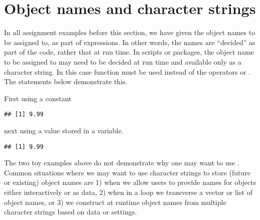 \documentclass[krantz2]{krantz}\usepackage{knitr}%
\begin{document}
\section{Object names and character strings}

In all assignment examples before this section, we have given the object names to be assigned to, as part of expressions. In other words, the names are ``decided'' as part of the code, rather that at run time. In scripts or packages, the object name to be assigned to may need to be decided at run time and available only as a character string. In this case function  must be used instead of the operators \code{<-} or \code{->}. The statements below demonstrate this.

First using a  constant

\begin{knitrout}\footnotesize
{}\color{fgcolor}\begin{kframe}
\begin{alltt}
\hlstd{(}\hlstd{,} \hlstd{)}
\end{alltt}
\begin{verbatim}
## [1] 9.99
\end{verbatim}
\end{kframe}
\end{knitrout}
next using a  value stored in a variable.

\begin{knitrout}\footnotesize
{}\color{fgcolor}\begin{kframe}
\begin{alltt}
 \hlkwb{<-} 
 \hlstd{)}
\end{alltt}
\begin{verbatim}
## [1] 9.99
\end{verbatim}
\end{kframe}
\end{knitrout}

The two toy examples above do not demonstrate why one may want to use . Common situations where we may want to use character strings to store (future or existing) object names are 1) when we allow users to provide names for objects either interactively or as  data, 2) when in a loop we transverse a vector or list of object names, or 3) we construct at runtime object names from multiple character strings based on data or settings.
\end{document}

